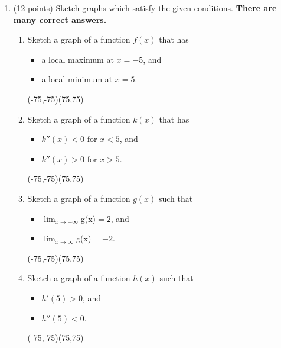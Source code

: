 \documentclass[12pt]{article}
\begin{document}
\newpage
\begin{enumerate}
\item (12 points) Sketch graphs which satisfy the given conditions. \textbf{There are many correct answers.}
	\begin{multicols}{2}
	\begin{enumerate}
	\item Sketch a graph of a function $f(x)$ that has
		\begin{itemize}
		\item a local maximum at $x=-5$, and
		\item a local minimum at $x=5$.
		\end{itemize}
	\begin{center}
	\coordsys[10][10](-75,-75)(75,75)
	\end{center}
	
	\item Sketch a graph of a function $k(x)$ that has
		\begin{itemize}
		\item $k''(x) < 0$ for $x<5$, and
		\item $k''(x) > 0$ for $x>5$.
		\end{itemize}
	\begin{center}
	\coordsys[10][10](-75,-75)(75,75)
	\end{center}

	
\columnbreak
\item Sketch a graph of a function $g(x)$ such that
		\begin{itemize}
		\item $\displaystyle \lim_{x \to -\infty} $g(x)$ = 2$, and
		\item $\displaystyle \lim_{x \to \infty} $g(x)$ = -2$.
		\end{itemize}
	\begin{center}
	\coordsys[10][10](-75,-75)(75,75)
	\end{center}

	\item Sketch a graph of a function $h(x)$ such that
		\begin{itemize}
		\item $h'(5)>0$, and
		\item $h''(5)<0$.
		\end{itemize}
	\begin{center}
	\coordsys[10][10](-75,-75)(75,75)
	\end{center}


\end{enumerate}
\end{multicols}
\end{enumerate}
\end{document}

